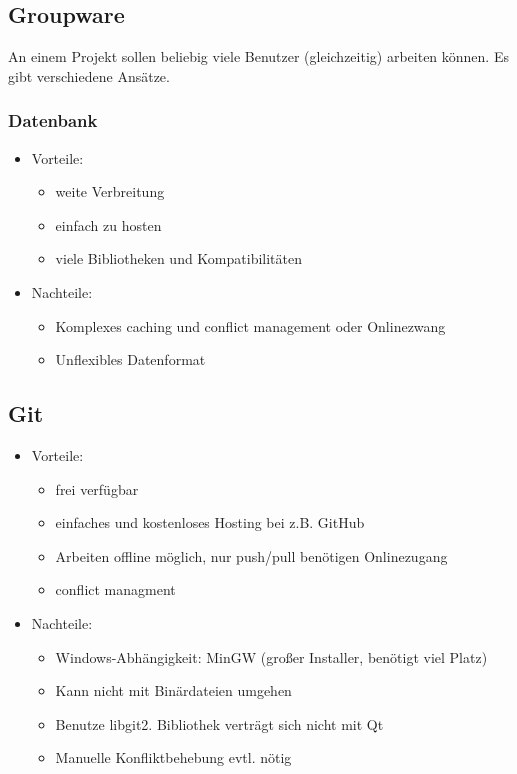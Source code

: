 \subsection{Groupware}

An einem Projekt sollen beliebig viele Benutzer (gleichzeitig) arbeiten können. Es gibt verschiedene Ansätze. 

\subsubsection{Datenbank}
\begin{itemize}
\item Vorteile:
	\begin{itemize}
	\item weite Verbreitung
	\item einfach zu hosten
	\item viele Bibliotheken und Kompatibilitäten
	\end{itemize}
\item Nachteile:
	\begin{itemize}
	\item Komplexes caching und conflict management oder Onlinezwang
	\item Unflexibles Datenformat
	\end{itemize}
\end{itemize}

\subsection{Git}
\begin{itemize}
\item Vorteile:
	\begin{itemize}
	\item frei verfügbar
	\item einfaches und kostenloses Hosting bei z.B. GitHub
	\item Arbeiten offline möglich, nur push/pull benötigen Onlinezugang
	\item conflict managment
	\end{itemize}
\item Nachteile:
	\begin{itemize}
	\item Windows-Abhängigkeit: MinGW (großer Installer, benötigt viel Platz)
	\item Kann nicht mit Binärdateien umgehen
	\item Benutze libgit2. Bibliothek verträgt sich nicht mit Qt
	\item Manuelle Konfliktbehebung evtl. nötig
	\end{itemize}
\end{itemize}


